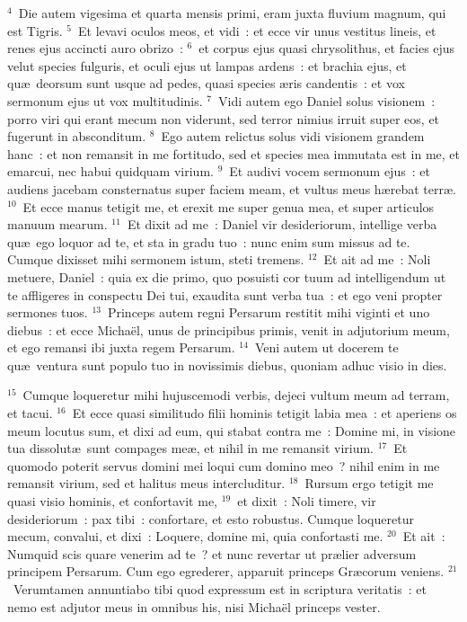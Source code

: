 ${}^{4}$~Die autem vigesima et quarta mensis primi, eram juxta fluvium magnum, qui est Tigris.
${}^{5}$~Et levavi oculos meos, et vidi~: et ecce vir unus vestitus lineis, et renes ejus accincti auro obrizo~:
${}^{6}$~et corpus ejus quasi chrysolithus, et facies ejus velut species fulguris, et oculi ejus ut lampas ardens~: et brachia ejus, et qu\ae\ deorsum sunt usque ad pedes, quasi species \ae ris candentis~: et vox sermonum ejus ut vox multitudinis.
${}^{7}$~Vidi autem ego Daniel solus visionem~: porro viri qui erant mecum non viderunt, sed terror nimius irruit super eos, et fugerunt in absconditum.
${}^{8}$~Ego autem relictus solus vidi visionem grandem hanc~: et non remansit in me fortitudo, sed et species mea immutata est in me, et emarcui, nec habui quidquam virium.
${}^{9}$~Et audivi vocem sermonum ejus~: et audiens jacebam consternatus super faciem meam, et vultus meus h\ae rebat terr\ae .
${}^{10}$~Et ecce manus tetigit me, et erexit me super genua mea, et super articulos manuum mearum.
${}^{11}$~Et dixit ad me~: Daniel vir desideriorum, intellige verba qu\ae\ ego loquor ad te, et sta in gradu tuo~: nunc enim sum missus ad te. Cumque dixisset mihi sermonem istum, steti tremens.
${}^{12}$~Et ait ad me~: Noli metuere, Daniel~: quia ex die primo, quo posuisti cor tuum ad intelligendum ut te affligeres in conspectu Dei tui, exaudita sunt verba tua~: et ego veni propter sermones tuos.
${}^{13}$~Princeps autem regni Persarum restitit mihi viginti et uno diebus~: et ecce Micha\"el, unus de principibus primis, venit in adjutorium meum, et ego remansi ibi juxta regem Persarum.
${}^{14}$~Veni autem ut docerem te qu\ae\ ventura sunt populo tuo in novissimis diebus, quoniam adhuc visio in dies.


${}^{15}$~Cumque loqueretur mihi hujuscemodi verbis, dejeci vultum meum ad terram, et tacui.
${}^{16}$~Et ecce quasi similitudo filii hominis tetigit labia mea~: et aperiens os meum locutus sum, et dixi ad eum, qui stabat contra me~: Domine mi, in visione tua dissolut\ae\ sunt compages me\ae , et nihil in me remansit virium.
${}^{17}$~Et quomodo poterit servus domini mei loqui cum domino meo~? nihil enim in me remansit virium, sed et halitus meus intercluditur.
${}^{18}$~Rursum ergo tetigit me quasi visio hominis, et confortavit me,
${}^{19}$~et dixit~: Noli timere, vir desideriorum~: pax tibi~: confortare, et esto robustus. Cumque loqueretur mecum, convalui, et dixi~: Loquere, domine mi, quia confortasti me.
${}^{20}$~Et ait~: Numquid scis quare venerim ad te~? et nunc revertar ut pr\ae lier adversum principem Persarum. Cum ego egrederer, apparuit princeps Gr\ae corum veniens.
${}^{21}$~Verumtamen annuntiabo tibi quod expressum est in scriptura veritatis~: et nemo est adjutor meus in omnibus his, nisi Micha\"el princeps vester.

